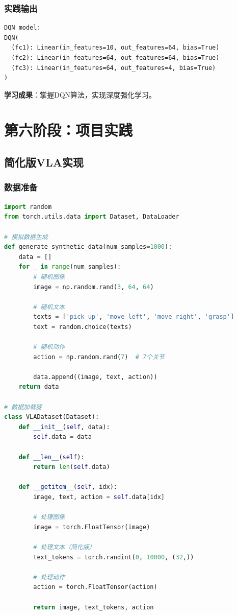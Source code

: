 \documentclass[12pt,a4paper]{article}
\begin{document}
\subsubsection{实践输出}

\begin{verbatim}
DQN model:
DQN(
  (fc1): Linear(in_features=10, out_features=64, bias=True)
  (fc2): Linear(in_features=64, out_features=64, bias=True)
  (fc3): Linear(in_features=64, out_features=4, bias=True)
)
\end{verbatim}

\textbf{学习成果}：掌握DQN算法，实现深度强化学习。

\section{第六阶段：项目实践}

\subsection{简化版VLA实现}

\subsubsection{数据准备}

\begin{lstlisting}[language=Python]
import random
from torch.utils.data import Dataset, DataLoader

# 模拟数据生成
def generate_synthetic_data(num_samples=1000):
    data = []
    for _ in range(num_samples):
        # 随机图像
        image = np.random.rand(3, 64, 64)
        
        # 随机文本
        texts = ['pick up', 'move left', 'move right', 'grasp']
        text = random.choice(texts)
        
        # 随机动作
        action = np.random.rand(7)  # 7个关节
        
        data.append((image, text, action))
    return data

# 数据加载器
class VLADataset(Dataset):
    def __init__(self, data):
        self.data = data
    
    def __len__(self):
        return len(self.data)
    
    def __getitem__(self, idx):
        image, text, action = self.data[idx]
        
        # 处理图像
        image = torch.FloatTensor(image)
        
        # 处理文本（简化版）
        text_tokens = torch.randint(0, 10000, (32,))
        
        # 处理动作
        action = torch.FloatTensor(action)
        
        return image, text_tokens, action
\end{lstlisting}
\end{document}
